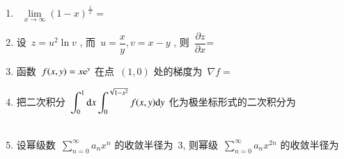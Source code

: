 \documentclass[twocolumn,landscape,fntef,UTF8]{ctexart}
\begin{document}
\begin{enumerate}%
			\item ~$\lim\limits_{x\rightarrow \infty}(1-x)^{\frac{\,1\,}{x}}=$%
			
			\item 设~$z = u^2\ln v$ , 而~$u= \dfrac{x}{y}, v = x-y$ , 则~$\dfrac{\partial z}{\partial x}$=%
			
			\item 函数~$f(x,y) = x\mathrm{e}^y$ 在点~$(1,0)$ 处的梯度为~$\nabla f = $
			\item 把二次积分~$\displaystyle{\int_0^1 \mathrm{d}x \int_0^{\sqrt{1-x^2}} f(x,y) \mathrm{d}y}$ 化为极坐标形式的二次积分为\\
			~
			
			\item 设幂级数~$\sum\limits_{n=0}^\infty a_nx^n$ 的收敛半径为~$3$, 则幂级~$\sum\limits_{n=0}^\infty a_nx^{2n}$ 的收敛半径为
\end{enumerate}
		
\newpage
\putzdx %
		
\end{document}
